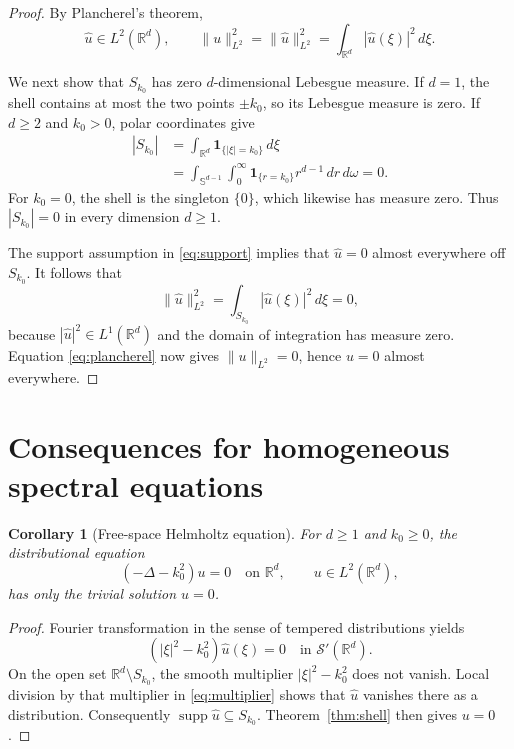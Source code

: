 \documentclass[11pt]{article}
\newtheorem{corollary}[theorem]{Corollary}
\theoremstyle{remark}
\newcommand{\R}{\mathbb{R}}
\newcommand{\supp}{\operatorname{supp}}
\newcommand{\one}{\mathbf{1}}
\begin{document}
\begin{proof}
By Plancherel's theorem,
\begin{equation}
 \widehat u\in L^2(\R^d),\qquad
 \|u\|_{L^2}^2=\|\widehat u\|_{L^2}^2
 =\int_{\R^d}|\widehat u(\xi)|^2\,d\xi.
 \label{eq:plancherel}
\end{equation}

We next show that $S_{k_0}$ has zero $d$-dimensional Lebesgue measure.
If $d=1$, the shell contains at most the two points $\pm k_0$, so
its Lebesgue measure is zero.  If $d\geq2$ and $k_0>0$, polar
coordinates give
\begin{align}
 |S_{k_0}|
 &=\int_{\R^d}\one_{\{|\xi|=k_0\}}\,d\xi\\
 &=\int_{\mathbb S^{d-1}}\int_0^\infty
     \one_{\{r=k_0\}}r^{d-1}\,dr\,d\omega
 =0.
 \label{eq:null}
\end{align}
For $k_0=0$, the shell is the singleton $\{0\}$, which likewise has
measure zero.  Thus $|S_{k_0}|=0$ in every dimension $d\geq1$.

The support assumption in \eqref{eq:support} implies that
$\widehat u=0$ almost everywhere off $S_{k_0}$.  It follows that
\begin{equation}
 \|\widehat u\|_{L^2}^2
 =\int_{S_{k_0}}|\widehat u(\xi)|^2\,d\xi
 =0,
 \label{eq:zero}
\end{equation}
because $|\widehat u|^2\in L^1(\R^d)$ and the domain of integration
has measure zero.  Equation \eqref{eq:plancherel} now gives
$\|u\|_{L^2}=0$, hence $u=0$ almost everywhere.
\end{proof}

\section{Consequences for homogeneous spectral equations}

\begin{corollary}[Free-space Helmholtz equation]
\label{cor:Helmholtz}
For $d\geq1$ and $k_0\geq0$, the distributional equation
\begin{equation}
 (-\Delta-k_0^2)u=0\quad\text{on }\R^d,
 \qquad u\in L^2(\R^d),
 \label{eq:Helmholtz}
\end{equation}
has only the trivial solution $u=0$.
\end{corollary}

\begin{proof}
Fourier transformation in the sense of tempered distributions yields
\begin{equation}
 (|\xi|^2-k_0^2)\widehat u(\xi)=0
 \quad\text{in }\mathcal S'(\R^d).
 \label{eq:multiplier}
\end{equation}
On the open set $\R^d\setminus S_{k_0}$, the smooth multiplier
$|\xi|^2-k_0^2$ does not vanish.  Local division by that multiplier
in \eqref{eq:multiplier} shows that $\widehat u$ vanishes there as a
distribution.  Consequently
$\supp\widehat u\subseteq S_{k_0}$.  Theorem~\ref{thm:shell}
then gives $u=0$.
\end{proof}
\end{document}
